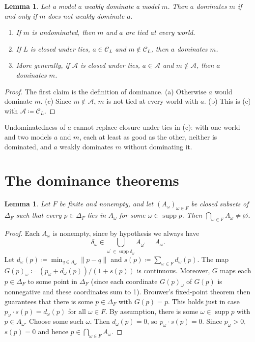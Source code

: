 \documentclass[11pt]{article}
\newtheorem{lemma}[theorem]{Lemma}
\theoremstyle{definition}
\newcommand{\C}{\mathcal C}
\newcommand{\supp}{\operatorname{supp}}
\begin{document}
\begin{lemma}\label{lem:ties}
Let a model $a$ weakly dominate a model $m$. Then $a$ dominates $m$ if and only if $m$ does not weakly dominate $a$.
\begin{enumerate}[label=(\alph*)]
\item If $m$ is undominated, then $m$ and $a$ are tied at every world.
\item If $L$ is closed under ties, $a\in\C_L$ and $m\notin\C_L$, then $a$ dominates $m$.
\item More generally, if $\mathcal A$ is closed under ties, $a\in\mathcal A$ and $m\notin\mathcal A$, then $a$ dominates $m$.
\end{enumerate}
\end{lemma}
\begin{proof}
The first claim is the definition of dominance. (a) Otherwise $a$ would dominate $m$. (c) Since $m\notin\mathcal A$, $m$ is not tied at every world with $a$. (b) This is (c) with $\mathcal A\coloneqq\C_L$.
\end{proof}
Undominatedness of $a$ cannot replace closure under ties in (c): with one world and two models $a$ and $m$, each at least as good as the other, neither is dominated, and $a$ weakly dominates $m$ without dominating it.

\section{The dominance theorems}\label{sec:general}

\begin{lemma}\label{lem:kkm}
Let $F$ be finite and nonempty, and let $(A_\omega)_{\omega\in F}$ be closed subsets of $\Delta_F$ such that every $p\in\Delta_F$ lies in $A_\omega$ for some $\omega\in\supp p$. Then $\bigcap_{\omega\in F}A_\omega\ne\varnothing$.
\end{lemma}
\begin{proof}
Each $A_\omega$ is nonempty, since by hypothesis we always have 
\[
\delta_\omega\in\bigcup_{\omega^\prime\in\supp \delta_\omega}A_{\omega^\prime}=A_\omega.
\]
Let $d_\omega(p)\coloneqq\min_{q\in A_\omega}\lVert p-q \rVert$ and $s(p)\coloneqq\sum_{\omega\in F} d_\omega(p)$. The map $G(p)_\omega\coloneqq(p_\omega+d_\omega(p))/(1+s(p))$ is continuous. Moreover, $G$ maps each $p\in\Delta_F$ to some point in $\Delta_F$ (since each coordinate $G(p)_\omega$ of $G(p)$ is nonnegative and these coordinates sum to 1). Brouwer's fixed-point theorem then guarantees that there is some $p\in\Delta_F$ with $G(p)=p$. This holds just in case $p_\omega\cdot s(p)=d_\omega(p)$ for all $\omega\in F$. By assumption, there is some $\omega\in\supp p$ with $p\in A_\omega$. Choose some such $\omega$. Then $d_\omega(p)=0$, so $p_\omega\cdot s(p)=0$. Since $p_\omega>0$, $s(p)=0$ and hence $p\in\bigcap_{\omega\in F}A_\omega$.
\end{proof}
\end{document}
